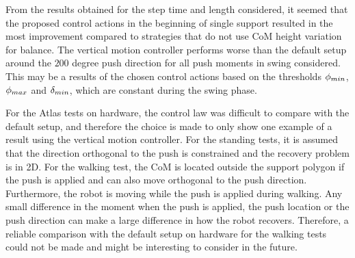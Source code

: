 From the results obtained for the step time and length considered, it seemed that the proposed control actions in the beginning of single support resulted in the most improvement compared to strategies that do not use \ac{CoM} height variation for balance. The vertical motion controller performs worse than the default setup around the $200$ degree push direction for all push moments in swing considered. This may be a results of the chosen control actions based on the thresholds $\phi_{min}$, $\phi_{max}$ and $\delta_{min}$, which are constant during the swing phase.

For the Atlas tests on hardware, the control law was difficult to compare with the default setup, and therefore the choice is made to only show one example of a result using the vertical motion controller. For the standing tests, it is assumed that the direction orthogonal to the push is constrained and the recovery problem is in \ac{2D}. For the walking test, the \ac{CoM} is located outside the support polygon if the push is applied and can also move orthogonal to the push direction. Furthermore, the robot is moving while the push is applied during walking. Any small difference in the moment when the push is applied, the push location or the push direction can make a large difference in how the robot recovers. Therefore, a reliable comparison with the default setup on hardware for the walking tests could not be made and might be interesting to consider in the future. 
